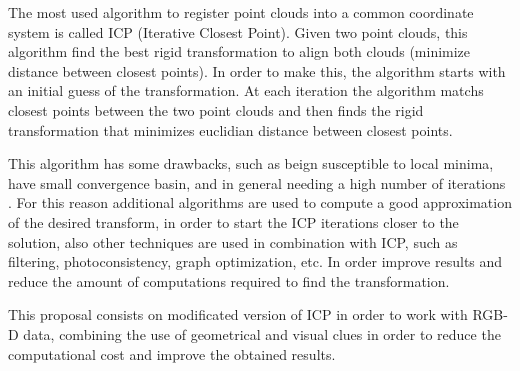 
The most used algorithm to register point clouds into a common coordinate 
system is called 
ICP (Iterative Closest Point). Given two point clouds, 
this algorithm find the best rigid transformation to align both clouds 
(minimize distance between closest points). In order to make this, 
the algorithm starts with an initial guess of the transformation. 
At each iteration the algorithm matchs closest points between the two point clouds  and then 
finds the rigid transformation that minimizes euclidian distance between closest points.

This algorithm has some drawbacks, such as beign susceptible to local minima, 
have small convergence basin, and in general needing a high number of iterations \cite{Rusu2009}. For this reason additional 
algorithms are used to compute a good approximation of the desired transform, in order to start the ICP iterations closer to the solution, also
 other techniques are used in combination with ICP, such as filtering, photoconsistency, graph optimization, etc. In order improve results and 
reduce the amount of computations required to find the transformation.


This proposal consists on modificated version of ICP in order to work with RGB-D data, combining the use of geometrical and visual clues in 
order to reduce the computational cost and improve the obtained results.
